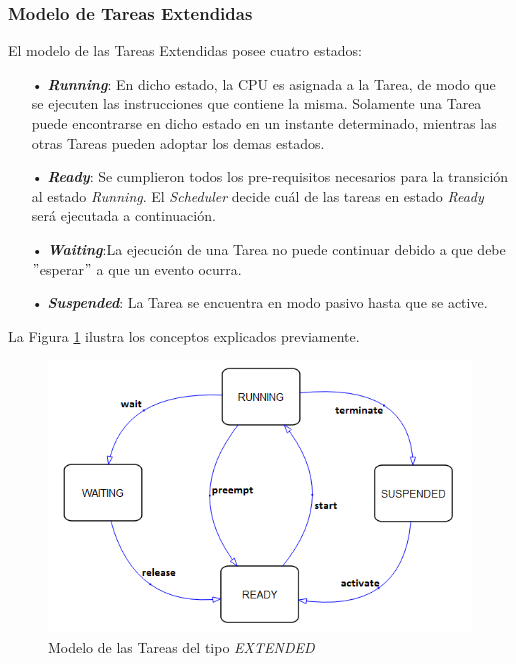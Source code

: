 \documentclass[12pt,letterpaper]{article}
\begin{document}
\subsubsection{Modelo de Tareas Extendidas}
El modelo de las Tareas Extendidas posee cuatro estados:
\begin{enumerate}
\item[•]\emph{\textbf{Running}}: En dicho estado, la CPU es asignada a la Tarea, de modo que se ejecuten las instrucciones que contiene la misma. Solamente una Tarea puede encontrarse en dicho estado en un instante determinado, mientras las otras Tareas pueden adoptar los demas estados.
\item[•]\emph{\textbf{Ready}}: Se cumplieron todos los pre-requisitos necesarios para la transición al estado \textit{Running}. El \textit{Scheduler} decide cuál de las tareas en estado \textit{Ready} será ejecutada a continuación.
\item[•]\emph{\textbf{Waiting}}:La ejecución de una Tarea no puede continuar debido a que debe $"$esperar$"$ a que un evento ocurra.
\item[•]\emph{\textbf{Suspended}}: La Tarea se encuentra en modo pasivo hasta que se active.
\end{enumerate}

La Figura \ref{Fig33} ilustra los conceptos explicados previamente.
\begin{center}
\begin{figure}[!h]
\centering
\includegraphics[width=8 cm]{figuras/f15.png}
\caption{Modelo de las Tareas del tipo \textit{EXTENDED}}
\label{Fig33}
\end{figure}
\end{center}
\end{document}
